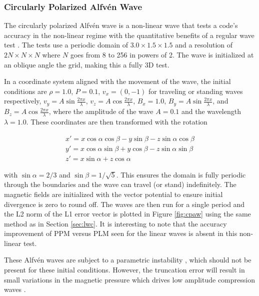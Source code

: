 \documentclass[modern, linenumbers]{aastex631}
\begin{document}
\subsubsection{Circularly Polarized Alfv\'en Wave}
\label{sec:cpaw}

The circularly polarized Alfv\'en wave is a non-linear wave that tests a code's accuracy in the non-linear regime with the quantitative benefits of a regular wave test \citep{Toth1996}. The tests use a periodic domain of $3.0\times1.5\times1.5$ and a resolution of $2N\times N \times N$ where $N$ goes from 8 to 256 in powers of 2. The wave is initialized at an oblique angle the grid, making this a fully 3D test.

In a coordinate system aligned with the movement of the wave, the initial conditions are
$\rho = 1.0$,
$P = 0.1$,
$v_x = (0,-1)$ for traveling or standing waves respectively,
$v_y = A \sin{\frac{2\pi x}{\lambda}}$,
$v_z = A \cos{\frac{2\pi x}{\lambda}}$,
$B_x = 1.0$,
$B_y = A \sin{\frac{2\pi x}{\lambda}}$,
and $B_z = A \cos{\frac{2\pi x}{\lambda}}$,
where the amplitude of the wave $A = 0.1$ and the wavelength $\lambda = 1.0$. These coordinates are then transformed with the rotation

\begin{eqnarray}
    x\prime = x \cos\alpha\cos\beta - y \sin\beta - z \sin\alpha\cos\beta \nonumber \\
    y\prime = x \cos\alpha\sin\beta + y \cos\beta - z \sin\alpha\sin\beta \nonumber \\
    z\prime = x \sin\alpha + z \cos\alpha \nonumber
\end{eqnarray}

\noindent with $\sin\alpha = 2/3$ and $\sin\beta = 1/\sqrt{5}$. This ensures the domain is fully periodic through the boundaries and the wave can travel (or stand) indefinitely. The magnetic fields are initialized with the vector potential to ensure initial divergence is zero to round off. The waves are then run for a single period and the L2 norm of the L1 error vector is plotted in Figure \ref{fig:cpaw} using the same method as in Section \ref{sec:lwc}. It is interesting to note that the accuracy improvement of PPM versus PLM seen for the linear waves is absent in this non-linear test.

These Alfv\'en waves are subject to a parametric instability \citep{del_zanna_parametric_2001}, which should not be present for these initial conditions. However, the truncation error will result in small variations in the magnetic pressure which drives low amplitude compression waves \citep{stone_athena_2008}.
\end{document}
